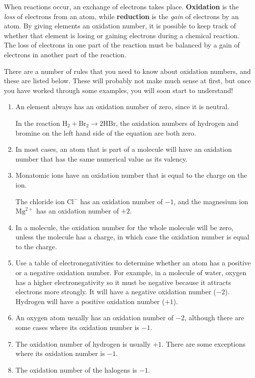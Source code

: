When reactions occur, an exchange of electrons takes place. \textbf{Oxidation} is the \textit{loss} of electrons from an atom, while \textbf{reduction} is the \textit{gain} of electrons by an atom.  By giving elements an oxidation number, it is possible to keep track of whether that element is losing or gaining electrons during a chemical reaction. The loss of electrons in one part of the reaction must be balanced by a gain of electrons in another part of the reaction.



There are a number of rules that you need to know about oxidation numbers, and these are listed below. These will probably not make much sense at first, but once you have worked through some examples, you will soon start to understand!

\begin{enumerate}[label=\textbf{Rule \arabic* :}]
\item {An element always has an oxidation number of zero, since it is neutral.

In the reaction ${\text{H}_{2} + \text{Br}_{2} \rightarrow 2\text{HBr}}$, the oxidation numbers of hydrogen and bromine on the left hand side of the equation are both zero.
}

\item {In most cases, an atom that is part of a molecule will have an oxidation number that has the same numerical value as its valency.}

\item{ Monatomic ions have an oxidation number that is equal to the charge on the ion.

The chloride ion $\text{Cl}^{-}$ has an oxidation number of $-1$, and the magnesium ion $\text{Mg}^{2+}$ has an oxidation number of $+2$.
}
\item{ In a molecule, the oxidation number for the whole molecule will be zero, unless the molecule has a charge, in which case the oxidation number is equal to the charge.}

\item{Use a table of electronegativities to determine whether an atom has a positive or a negative oxidation number. For example, in a molecule of water, oxygen has a higher electronegativity so it must be negative because it attracts electrons more strongly. It will have a negative oxidation number ($-2$). Hydrogen will have a positive oxidation number ($+1$).}

\item{An oxygen atom usually has an oxidation number of $-2$, although there are some cases where its oxidation number is $-1$.}

\item{The oxidation number of hydrogen is usually $+1$. There are some exceptions where its oxidation number is $-1$.}

\item{The oxidation number of the halogens is $-1$.}

\end{enumerate}

